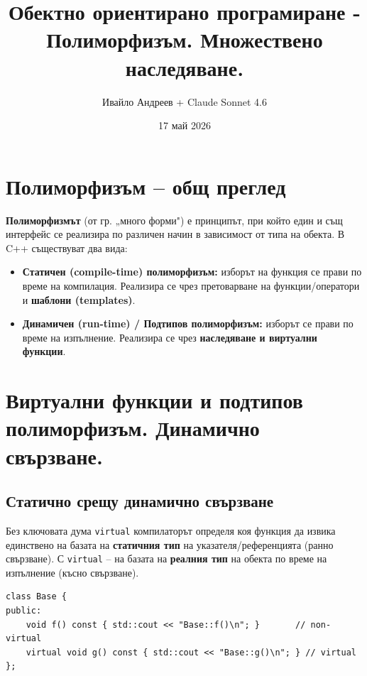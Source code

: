\documentclass{scrartcl}
\title{Обектно ориентирано програмиране - Полиморфизъм. Множествено наследяване.}
\author{Ивайло Андреев + Claude Sonnet 4.6}
\date{17 май 2026}
\begin{document}
\maketitle

\tableofcontents

\newpage

\begin{FlushLeft}

\section{Полиморфизъм -- общ преглед}

\textbf{Полиморфизмът} (от гр. „много форми") е принципът, при който един и същ интерфейс се реализира по различен начин в зависимост от типа на обекта. В C++ съществуват два вида:

\begin{itemize}
    \item \textbf{Статичен (compile-time) полиморфизъм:} изборът на функция се прави по време на компилация. Реализира се чрез претоварване на функции/оператори и \textbf{шаблони (templates)}.
    \item \textbf{Динамичен (run-time) / Подтипов полиморфизъм:} изборът се прави по време на изпълнение. Реализира се чрез \textbf{наследяване и виртуални функции}.
\end{itemize}

\section{Виртуални функции и подтипов полиморфизъм. Динамично свързване.}

\subsection{Статично срещу динамично свързване}

Без ключовата дума \texttt{virtual} компилаторът определя коя функция да извика единствено на базата на \textbf{статичния тип} на указателя/референцията (ранно свързване). С \texttt{virtual} -- на базата на \textbf{реалния тип} на обекта по време на изпълнение (късно свързване).

\begin{lstlisting}
class Base {
public:
    void f() const { std::cout << "Base::f()\n"; }       // non-virtual
    virtual void g() const { std::cout << "Base::g()\n"; } // virtual
};


\end{lstlisting}
\end{FlushLeft}
\end{document}
